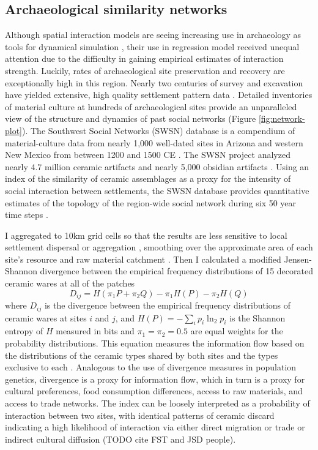 \documentclass[10pt]{iopart}
\begin{document}
\subsection*{Archaeological similarity networks}
Although spatial interaction models are seeing increasing use in archaeology as tools for dynamical simulation \parencite{Bevan2013, Evans2011}, their use in regression model received unequal attention \parencite{Johnson1990ChumashAnalysis,Tobler1971,Hodder1974} due to the difficulty in gaining empirical estimates of interaction strength. Luckily, rates of archaeological site preservation and recovery are exceptionally high in this region. Nearly two centuries of survey and excavation have yielded extensive, high quality settlement pattern data \parencite{Hill2004}. Detailed inventories of material culture at hundreds of archaeological sites provide an unparalleled view of the structure and dynamics of past social networks (Figure \ref{fig:network-plot}). The Southwest Social Networks (SWSN) database is a compendium of material-culture data from nearly 1,000 well-dated sites in Arizona and western New Mexico from between 1200 and 1500 CE \parencite{Mills2012,Mills2013a,Peeples2013,Borck2015,Hill2015,Mills2015a}. The SWSN project analyzed nearly 4.7 million ceramic artifacts and nearly 5,000 obsidian artifacts \parencite{Mills2015a}. Using an index of the similarity of ceramic assemblages as a proxy for the intensity of social interaction between settlements, the SWSN database provides quantitative estimates of the topology of the region-wide social network during six 50 year time steps \parencite{Mills2013a}. 

I aggregated to 10km grid cells so that the results are less sensitive to local settlement dispersal or aggregation \parencite{paliou2015}, smoothing over the approximate area of each site's resource and raw material catchment \parencite{varien1999}. Then I calculated a modified Jensen-Shannon divergence between the empirical frequency distributions of 15 decorated ceramic wares at all of the patches
\begin{equation}
    D_{ij} = H\left(\pi_1P + \pi_2Q\right) - \pi_1H(P) - \pi_2H(Q)
\end{equation}
where $D_{ij}$ is the divergence between the empirical frequency distributions of ceramic wares at sites $i$ and $j$, and $H(P) = -\sum_i p_i \ln_2 p_i$ is the Shannon entropy of $H$ measured in bits and $\pi_1 = \pi_2 = 0.5$ are equal weights for the probability distributions. This equation measures the information flow based on the distributions of the ceramic types shared by both sites and the types exclusive to each \parencite{Masucci2011,PaoloMasucci2012}. Analogous to the use of divergence measures in population genetics, divergence is a proxy for information flow, which in turn is a proxy for cultural preferences, food consumption differences, access to raw materials, and access to trade networks. The index can be loosely interpreted as a probability of interaction between two sites, with identical patterns of ceramic discard indicating a high likelihood of interaction via either direct migration or trade or indirect cultural diffusion (TODO cite FST and JSD people).
\end{document}
